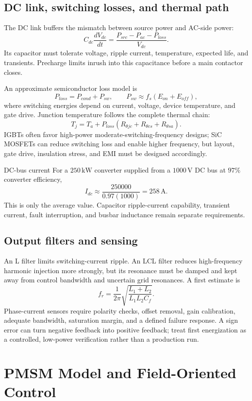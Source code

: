 \documentclass[11pt]{article}
\newcommand{\V}{\mathrm{V}}
\newcommand{\A}{\mathrm{A}}
\newcommand{\kW}{\mathrm{kW}}
\begin{document}
\subsection{DC link, switching losses, and thermal path}
The DC link buffers the mismatch between source power and AC-side power:
\[
C_{dc}\frac{dV_{dc}}{dt}=\frac{P_{src}-P_{ac}-P_{loss}}{V_{dc}}.
\]
Its capacitor must tolerate voltage, ripple current, temperature, expected life, and transients. Precharge limits inrush into this capacitance before a main contactor closes.

An approximate semiconductor loss model is
\[
P_{loss}=P_{cond}+P_{sw},\qquad P_{sw}\approx f_s(E_{on}+E_{off}),
\]
where switching energies depend on current, voltage, device temperature, and gate drive. Junction temperature follows the complete thermal chain:
\[
T_j=T_a+P_{loss}(R_{\theta jc}+R_{\theta cs}+R_{\theta sa}).
\]
IGBTs often favor high-power moderate-switching-frequency designs; SiC MOSFETs can reduce switching loss and enable higher frequency, but layout, gate drive, insulation stress, and EMI must be designed accordingly.

\begin{examplebox}{DC-bus current}
For a $250\,\kW$ converter supplied from a $1000\,\V$ DC bus at $97\%$ converter efficiency,
\[
I_{dc}\approx\frac{250000}{0.97(1000)}=258\,\A.
\]
This is only the average value. Capacitor ripple-current capability, transient current, fault interruption, and busbar inductance remain separate requirements.
\end{examplebox}

\subsection{Output filters and sensing}
An L filter limits switching-current ripple. An LCL filter reduces high-frequency harmonic injection more strongly, but its resonance must be damped and kept away from control bandwidth and uncertain grid resonances. A first estimate is
\[
f_r=\frac{1}{2\pi}\sqrt{\frac{L_1+L_2}{L_1L_2C_f}}.
\]
Phase-current sensors require polarity checks, offset removal, gain calibration, adequate bandwidth, saturation margin, and a defined failure response. A sign error can turn negative feedback into positive feedback; treat first energization as a controlled, low-power verification rather than a production run.

\section{PMSM Model and Field-Oriented Control}
\end{document}
